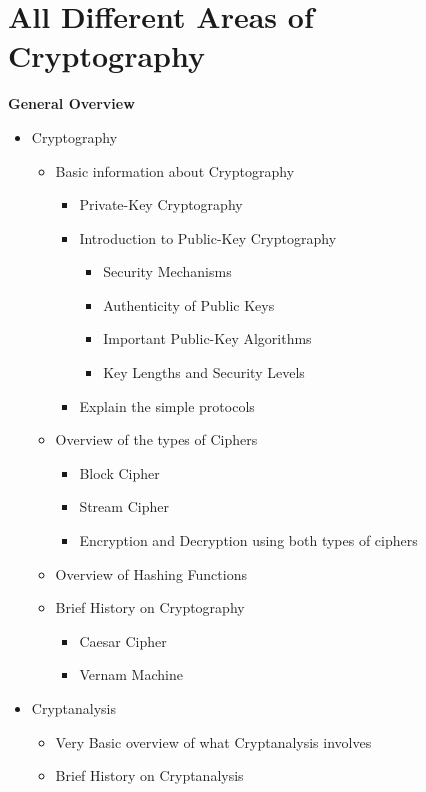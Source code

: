\section{All Different Areas of Cryptography}
\textbf{General Overview}
\begin{itemize}
\item{Cryptography
\begin{itemize}
\item{Basic information about Cryptography
\begin{itemize} %
\item{Private-Key Cryptography}
\item{Introduction to Public-Key Cryptography
\begin{itemize}
\item{Security Mechanisms}
\item{Authenticity of Public Keys}
\item{Important Public-Key Algorithms}
\item{Key Lengths and Security Levels}
\end{itemize}}
\item{Explain the simple protocols}
\end{itemize}}
\item{Overview of the types of Ciphers
\begin{itemize}
\item{Block Cipher}
\item{Stream Cipher}
\item{Encryption and Decryption using both types of ciphers}
\end{itemize}}
\item{Overview of Hashing Functions}
\item{Brief History on Cryptography
\begin{itemize}
\item{Caesar Cipher}
\item{Vernam Machine}
\end{itemize}}
\end{itemize}}
\item{Cryptanalysis
\begin{itemize}
\item{Very Basic overview of what Cryptanalysis involves}
\item{Brief History on Cryptanalysis}
\end{itemize}}
\end{itemize}

